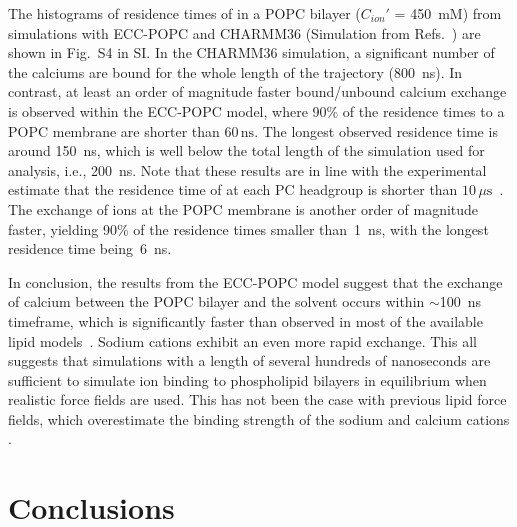 \documentclass[aip,jcp,twocolumn]{revtex4}
\begin{document}
The histograms of residence times of  in a POPC bilayer ($C_{ion}'$ = 450~mM) from simulations with 
ECC-POPC and CHARMM36 (Simulation from Refs.~) are shown in Fig.~S4 in SI.
In the CHARMM36 simulation, a significant number of the calciums are bound for the whole length of the trajectory (800~ns).
In contrast, at least an order of magnitude faster bound/unbound calcium exchange is observed within the ECC-POPC model,
where 90\% of the  residence times to a POPC membrane are shorter than $60\,\mathrm{ns}$. The longest observed
residence time is around 150~ns, which is well below the total length of the simulation used for analysis, i.e., 200~ns.
Note that these results are in line with the experimental estimate that the residence time of  at each PC
headgroup is shorter than $10\,\mu\mathrm{s}$~\cite{altenbach84}. The exchange of  ions at the POPC membrane
is another order of magnitude faster, yielding 90\% of the residence times smaller than~1~ns, with the longest residence time being~6~ns.

In conclusion, the results from the ECC-POPC model suggest that the exchange of calcium between the POPC bilayer and the solvent occurs within $\sim$100~ns timeframe, which is significantly faster than observed in most of the available lipid models~\cite{javanainen17}. Sodium cations exhibit an even more rapid exchange. This all suggests that simulations with a length of several hundreds of nanoseconds are sufficient to simulate ion binding to phospholipid bilayers in equilibrium when realistic force fields are used. This has not been the case with previous lipid force fields, which overestimate the binding strength of the sodium and calcium cations \cite{javanainen17, catte16}.




\section{Conclusions}
\end{document}
